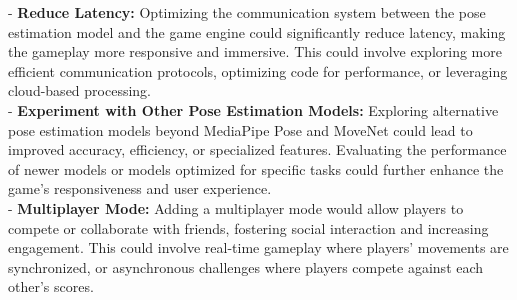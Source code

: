 \documentclass[12pt]{article}
\begin{document}
- \textbf{Reduce Latency:} Optimizing the communication system between the pose estimation model and the game engine could significantly reduce latency, making the gameplay more responsive and immersive. This could involve exploring more efficient communication protocols, optimizing code for performance, or leveraging cloud-based processing.\\

- \textbf{Experiment with Other Pose Estimation Models:} Exploring alternative pose estimation models beyond MediaPipe Pose and MoveNet could lead to improved accuracy, efficiency, or specialized features. Evaluating the performance of newer models or models optimized for specific tasks could further enhance the game's responsiveness and user experience.\\

- \textbf{Multiplayer Mode:} Adding a multiplayer mode would allow players to compete or collaborate with friends, fostering social interaction and increasing engagement. This could involve real-time gameplay where players' movements are synchronized, or asynchronous challenges where players compete against each other's scores.\\
\clearpage


\end{document}
